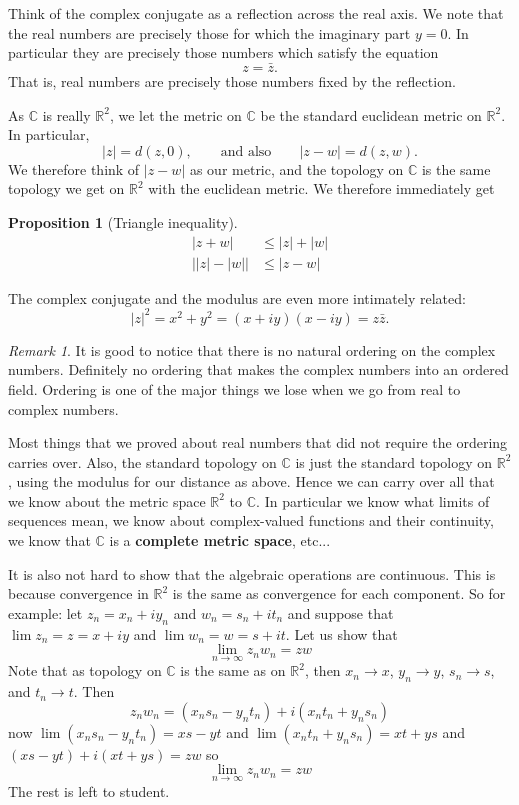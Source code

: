 \documentclass[12pt]{book}
\newcommand{\abs}[1]{\left\lvert {#1} \right\rvert}
\newcommand{\C}{{\mathbb{C}}}
\newcommand{\R}{{\mathbb{R}}}
\theoremstyle{plain}
\newtheorem{prop}[thm]{Proposition}
\theoremstyle{remark}
\newtheorem{remark}[thm]{Remark}
\theoremstyle{definition}
\theoremstyle{exercise}
\theoremstyle{example}
\begin{document}
Think of the complex conjugate as a reflection across the real axis.
We note that the real numbers are precisely those for which the imaginary
part $y=0$.  In particular they are precisely those numbers which satisfy
the equation
\begin{equation*}
z = \bar{z} .
\end{equation*}
That is, real numbers are precisely those numbers fixed by the reflection.

As $\C$ is really $\R^2$, we let the metric on $\C$ be the standard
euclidean metric on $\R^2$.
In particular,
\begin{equation*}
\abs{z} = d(z,0) , \qquad 
\text{and also} \qquad 
\abs{z-w} = d(z,w) .
\end{equation*}
We therefore think of $\abs{z-w}$ as our metric, and the topology on $\C$ is
the same topology we get on $\R^2$ with the euclidean metric.
We therefore immediately get

\begin{prop}[Triangle inequality]
\begin{align*}
\abs{z+w} & \leq \abs{z}+\abs{w} \\
\big\lvert \abs{z}-\abs{w} \big\rvert & \leq \abs{z-w}
\end{align*}
\end{prop}

The complex conjugate and the modulus are even more intimately related:
\begin{equation*}
\abs{z}^2 =
x^2+y^2 =
(x+iy)(x-iy) =
z \bar{z} .
\end{equation*}

\begin{remark}
It is good to notice that there is no natural ordering on the complex numbers.
Definitely no ordering that makes the complex numbers into an ordered field.
Ordering is one of the major things we lose when we go from real to complex
numbers.
\end{remark}


Most things that we proved about real numbers that did not require
the ordering carries over.  Also, the standard topology on $\C$ is
just the standard topology on $\R^2$, using the modulus for our distance
as above.  Hence we can carry over all that we know about the metric
space $\R^2$ to $\C$.  In particular we know what limits of
sequences mean, we know about complex-valued functions and their continuity,
we know that $\C$ is a \textbf{complete metric space},
etc...

It is also not hard to show that the algebraic operations are
continuous.  This is because convergence in 
$\R^2$ is the same as convergence for each component.  So for example:
let $z_n = x_n + iy_n$ and
$w_n = s_n + it_n$ and suppose that
$\lim z_n = z = x+iy$ and $\lim w_n = w = s+it$.
Let us show that
$$
\lim_{n\to\infty} z_n w_n = zw
$$
Note that as topology on $\C$ is the same as on $\R^2$, then
$x_n \to x$, $y_n \to y$, $s_n \to s$, and $t_n \to t$.  Then
$$
z_n w_n = (x_ns_n-y_nt_n) + i(x_nt_n+y_ns_n)
$$
now 
$\lim (x_ns_n-y_nt_n) = xs-yt$ and
$\lim (x_nt_n+y_ns_n) = xt+ys$ and
$(xs-yt)+i(xt+ys) = zw$ so
$$
\lim_{n\to\infty} z_n w_n = zw
$$
The rest is left to student.  
\end{document}
